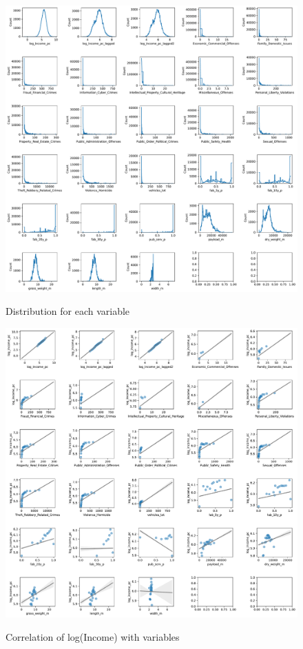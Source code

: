 \begin{figure}[H]
    \centering
    \caption{Distribution for each variable}
    \includegraphics[width=1\textwidth]{../figures/figB_histograms_ml_dataset_variables.pdf}
    \label{fig:enter-label}
\end{figure}


\begin{figure}[H]
    \centering
    \caption{Correlation of log(Income) with variables}
    \includegraphics[width=1\textwidth]{../figures/figC_correlation_ml_dataset_variables.pdf}
    \label{fig:enter-label}
\end{figure}


